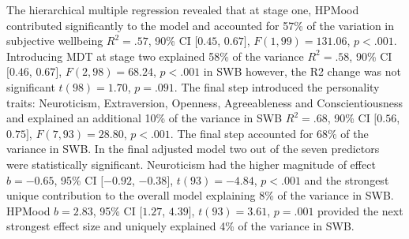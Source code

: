 \documentclass[man,floatsintext]{apa6}
\begin{document}
The hierarchical multiple regression revealed that at stage one, HPMood
contributed significantly to the model and accounted for 57\% of the
variation in subjective wellbeing \(R^2 = .57\), 90\% CI \([0.45\),
\(0.67]\), \(F(1, 99) = 131.06\), \(p < .001\). Introducing MDT at stage
two explained 58\% of the variance \(R^2 = .58\), 90\% CI \([0.46\),
\(0.67]\), \(F(2, 98) = 68.24\), \(p < .001\) in SWB however, the R2
change was not significant \(t(98) = 1.70\), \(p = .091\). The final
step introduced the personality traits: Neuroticism, Extraversion,
Openness, Agreeableness and Conscientiousness and explained an
additional 10\% of the variance in SWB \(R^2 = .68\), 90\% CI \([0.56\),
\(0.75]\), \(F(7, 93) = 28.80\), \(p < .001\). The final step accounted
for 68\% of the variance in SWB. In the final adjusted model two out of
the seven predictors were statistically significant. Neuroticism had the
higher magnitude of effect \(b = -0.65\), 95\% CI \([-0.92\),
\(-0.38]\), \(t(93) = -4.84\), \(p < .001\) and the strongest unique
contribution to the overall model explaining 8\% of the variance in SWB.
HPMood \(b = 2.83\), 95\% CI \([1.27\), \(4.39]\), \(t(93) = 3.61\),
\(p = .001\) provided the next strongest effect size and uniquely
explained 4\% of the variance in SWB.
\end{document}
